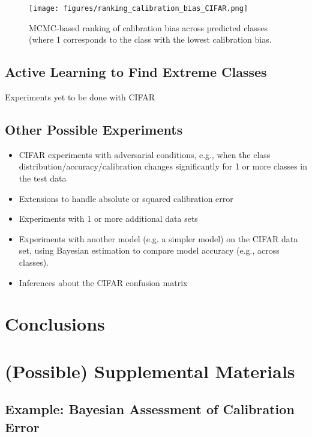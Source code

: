 \documentclass{article}
\begin{document}
\begin{figure}[h]
 \centering
   \texttt{[image: figures/ranking\_calibration\_bias\_CIFAR.png]}   
\caption{MCMC-based ranking of calibration bias across predicted classes (where 1 corresponds to the class with the lowest calibration bias.} 
\label{fig:ranking_bias}
\end{figure}

\subsection{Active Learning to Find Extreme Classes}

Experiments yet to be done with CIFAR


\subsection{Other Possible Experiments}
\begin{itemize}
   \item CIFAR experiments with adversarial conditions, e.g., when the class distribution/accuracy/calibration changes significantly for 1 or more classes in the test data
   \item Extensions to handle absolute or squared calibration error
    \item Experiments with 1 or more additional data sets
    \item Experiments with another model (e.g. a simpler model) on the CIFAR data set, using Bayesian estimation to compare model accuracy (e.g., across classes).
    \item Inferences about the CIFAR confusion matrix 
\end{itemize}
\section{Conclusions}

\newpage
\phantom{p}
\newpage  




\newpage
\phantom{p}
\newpage


\section*{(Possible) Supplemental Materials}

\subsection*{Example: Bayesian Assessment of Calibration Error}
\end{document}
